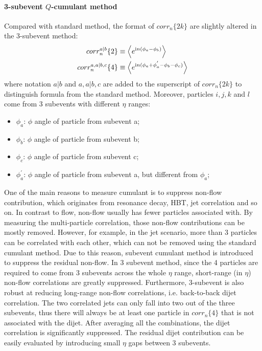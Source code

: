 \paragraph{3-subevent $Q$-cumulant method}
Compared with standard method, the format of $corr_n\{2k\}$ are slightly altered in the 3-subevent method:
\begin{equation}
\begin{split}
corr_n^{a|b}\{2\}&\equiv \left\langle e^{\text{i}n(\phi_a-\phi_b)}\right\rangle \\
corr_n^{a,a|b,c}\{4\}&\equiv \left\langle e^{\text{i}n(\phi_a+\phi_a^{'}-\phi_b-\phi_c)}\right\rangle
\end{split}
\end{equation}
where notation $a|b$ and $a,a|b,c$ are added to the superscript of $corr_n\{2k\}$ to distinguish formula from the standard method. Moreover, particles $i,j,k$ and $l$ come from 3 subevents with different $\eta$ ranges:
\begin{itemize}
\item $\phi_a$: $\phi$ angle of particle from subevent a;
\item $\phi_b$: $\phi$ angle of particle from subevent b;
\item $\phi_c$: $\phi$ angle of particle from subevent c;
\item $\phi_a^{'}$: $\phi$ angle of particle from subevent a, but different from $\phi_a$;
\end{itemize}
One of the main reasons to measure cumulant is to suppress non-flow contribution, which originates from resonance decay, HBT, jet correlation and so on. In contrast to flow, non-flow usually has fewer particles associated with. By measuring the multi-particle correlation, those non-flow contributions can be mostly removed. However, for example, in the jet scenario, more than 3 particles can be correlated with each other, which can not be removed using the standard cumulant method. Due to this reason, subevent cumulant method is introduced to suppress the residual non-flow. In 3 subevent method, since the 4 particles are required to come from 3 subevents across the whole $\eta$ range, short-range (in $\eta$) non-flow correlations are greatly suppressed. Furthermore, 3-subevent is also robust at reducing long-range non-flow correlations, i.e. back-to-back dijet correlation. The two correlated jets can only fall into two out of the three subevents, thus there will always be at least one particle in $corr_n\{4\}$ that is not associated with the dijet. After averaging all the combinations, the dijet correlation is significantly suppressed. The residual dijet contribution can be easily evaluated by introducing small $\eta$ gaps between 3 subevents.

